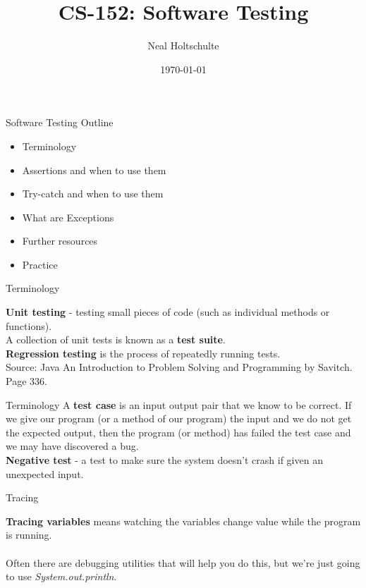 \documentclass{beamer}
\newcommand*{\TitleFont}{%
      \usefont{\encodingdefault}{\rmdefault}{b}{n}%
      \fontsize{32}{20}%
      \selectfont}
\begin{document}
\huge

\title{\TitleFont CS-152: Software Testing}
\author{Neal Holtschulte}
\date{\today}

\frame{\titlepage} %

\LARGE


\begin{frame}[fragile]{ Software Testing Outline}
\begin{itemize}
\item Terminology
\item Assertions and when to use them
\item Try-catch and when to use them
\item What are Exceptions
\item Further resources
\item Practice
\end{itemize}
\end{frame}


\begin{frame}[fragile]{ Terminology}

{\bf Unit testing} - testing small pieces of code (such as individual methods or functions).\\

A collection of unit tests is known as a {\bf test suite}.\\

{\bf Regression testing} is the process of repeatedly running tests.\\
\small
Source: Java An Introduction to Problem Solving and Programming by Savitch. Page 336.
\end{frame}


\begin{frame}[fragile]{ Terminology}
A {\bf test case} is an input output pair that we know to be correct. If we give our program (or a method of our program) the input and we do not get the expected output, then the program (or method) has failed the test case and we may have discovered a bug.\\

{\bf Negative test} - a test to make sure the system doesn't crash if given an unexpected input.
\end{frame}


\begin{frame}[fragile]{ Tracing}

{\bf Tracing variables} means watching the variables change value while the program is running.\\ \ \\

Often there are debugging utilities that will help you do this, but we're just going to use \emph{System.out.println}.
\end{frame}
\end{document}
